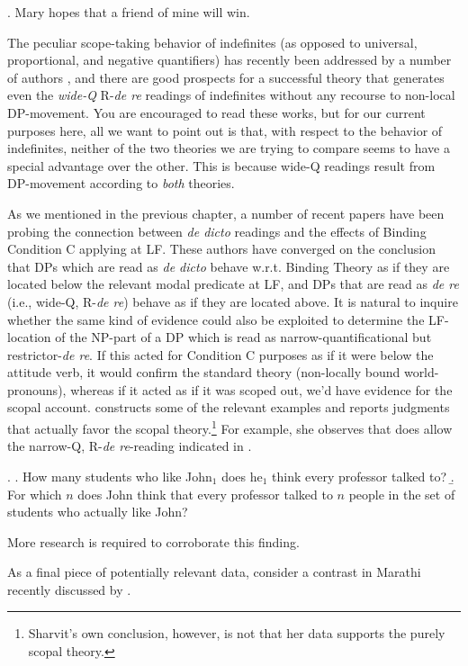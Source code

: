 \ex. Mary hopes that a friend of mine will win.

The peculiar scope-taking behavior of indefinites (as opposed to universal, proportional, and negative quantifiers) has recently been addressed by a number of authors \citep{abusch:1994:indefinites, reinhart:scope:97, winter:choice:97, matthewson:widescope:99, kratzer:pseudo:98}, and there are good prospects for a successful theory that generates even the \emph{wide-Q} R-\emph{de re} readings of indefinites without any recourse to non-local DP-movement. You are encouraged to read these works, but for our current purposes here, all we want to point out is that, with respect to the behavior of indefinites, neither of the two theories we are trying to compare seems to have a special advantage over the other. This is because wide-Q readings result from DP-movement according to \emph{both} theories.

As we mentioned in the previous chapter, a number of recent papers have been probing the connection between \emph{de dicto} readings and the effects of Binding Condition C applying at LF. These authors have converged on the conclusion that DPs which are read as \emph{de dicto} behave w.r.t. Binding Theory as if they are located below the relevant modal predicate at LF, and DPs that are read as \emph{de re} (i.e., wide-Q, R-\emph{de re}) behave as if they are located above. It is natural to inquire whether the same kind of evidence could also be exploited to determine the LF-location of the NP-part of a DP which is read as narrow-quantificational but restrictor-\emph{de re}. If this acted for Condition C purposes as if it were below the attitude verb, it would confirm the standard theory (non-locally bound world-pronouns), whereas if it acted as if it was scoped out, we'd have evidence for the scopal account. \citet{sharvit:howmany:98} constructs some of the relevant examples and reports judgments that actually favor the scopal theory.\footnote{Sharvit's own conclusion, however, is not that her data supports the purely scopal theory.} For example, she observes that \Next[a] does allow the narrow-Q, R-\emph{de re}-reading indicated in \Next[b].

\ex. \a. How many students who like John$_{1}$ does he$_{1}$ think every professor talked to? 
\b. For which $n$ does John think that every professor talked to $n$ people in the set of students who actually like John?

More research is required to corroborate this finding.

As a final piece of potentially relevant data, consider a contrast in Marathi recently discussed by \citet{bhatt:locality:99}.

